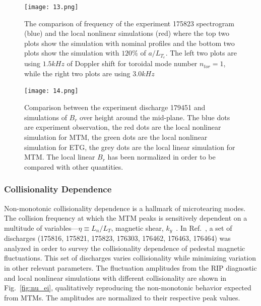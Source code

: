 \documentclass[
 aip,
 amsmath,amssymb,
 reprint
]{revtex4-1}
\begin{document}
\begin{figure}[ht]
        \texttt{[image: 13.png]}
        \centering
        \caption[font=5]{The comparison of frequency of the experiment 175823 spectrogram (blue) and the local nonlinear simulations (red) where the top two plots show the simulation with nominal profiles and the bottom two plots show the simulation with $120\%$ of $a/L_{T_e}$. The left two plots are using $1.5kHz$ of Doppler shift for toroidal mode number $n_{tor}=1$, while the right two plots are using $3.0kHz$}
        \label{fig:NL_f}
\end{figure}

\begin{figure}[ht]
        \texttt{[image: 14.png]}
        \centering
        \caption[font=5]{Comparison between the experiment discharge 179451 and simulations of $B_r$ over height around the mid-plane. The blue dots are experiment observation, the red dots are the local nonlinear simulation for MTM, the green dots are the local nonlinear simulation for ETG, the grey dots are the local linear simulation for MTM. The local linear $B_r$ has been normalized in order to be compared with other quantities. }
        \label{fig:Br_Z}
\end{figure}

\subsubsection{Collisionality Dependence}

Non-monotonic collisionality dependence is a hallmark of microtearing modes. The collision frequency at which the MTM peaks is sensitively dependent on a multitude of variables---$\eta\equiv L_n/L_T$, magnetic shear, $k_y$~\cite{Joel_prl,gladd}. 
In Ref.~\cite{RIP_Chen_POP_2021}, a set of discharges (175816, 175821, 175823, 176303, 176462, 176463, 176464) was analyzed in order to survey the collisionality dependence of pedestal magnetic fluctuations.
This set of discharges varies collisionality while minimizing variation in other relevant parameters. The fluctuation amplitudes from the RIP diagnostic and local nonlinear simulations with different collisionality are shown in Fig.~\ref{fig:nu_ei}, qualitatively reproducing the non-monotonic behavior expected from MTMs. The amplitudes are normalized to their respective peak values. 
\end{document}
